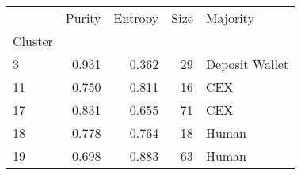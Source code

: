 \begin{tabular}{lrrrl}
\toprule
{} &  Purity &  Entropy &  Size &        Majority \\
Cluster &         &          &       &                 \\
\midrule
3       &   0.931 &    0.362 &    29 &  Deposit Wallet \\
11      &   0.750 &    0.811 &    16 &             CEX \\
17      &   0.831 &    0.655 &    71 &             CEX \\
18      &   0.778 &    0.764 &    18 &           Human \\
19      &   0.698 &    0.883 &    63 &           Human \\
\bottomrule
\end{tabular}
